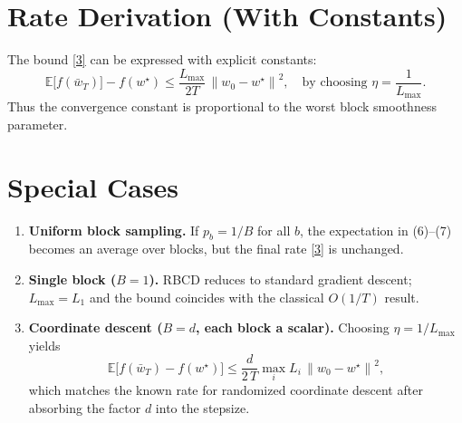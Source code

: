 \documentclass{article}
\newcommand{\E}{\mathbb{E}}
\newcommand{\norm}[1]{\left\lVert #1\right\rVert}
\begin{document}
\section*{Rate Derivation (With Constants)}
The bound \eqref{3} can be expressed with explicit constants:
\[
\E\!\bigl[f(\bar w_{T})\bigr]-f(w^{\star})
\le
\frac{L_{\max}}{2T}\,\norm{w_{0}-w^{\star}}^{2},
\quad\text{by choosing }\eta=\frac{1}{L_{\max}}.
\]
Thus the convergence constant is proportional to the worst block smoothness
parameter.

\section*{Special Cases}
\begin{enumerate}
\item \textbf{Uniform block sampling.}
If $p_{b}=1/B$ for all $b$, the expectation in (6)–(7) becomes an average over
blocks, but the final rate \eqref{3} is unchanged.
\item \textbf{Single block ($B=1$).}
RBCD reduces to standard gradient descent; $L_{\max}=L_{1}$ and the bound
coincides with the classical $O(1/T)$ result.
\item \textbf{Coordinate descent ($B=d$, each block a scalar).}
Choosing $\eta=1/L_{\max}$ yields
\[
\E\!\bigl[f(\bar w_{T})-f(w^{\star})\bigr]\le
\frac{d}{2\,T}\max_{i}L_{i}\,\norm{w_{0}-w^{\star}}^{2},
\]
which matches the known rate for randomized coordinate descent after
absorbing the factor $d$ into the stepsize.
\end{enumerate}
\end{document}
